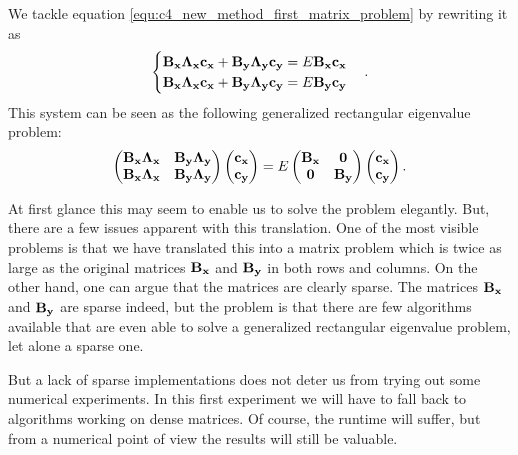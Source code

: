 We tackle equation \eqref{equ:c4_new_method_first_matrix_problem} by rewriting it as
$$
    \begin{cases}
        \vb{B_x} \vb{\Lambda_x}\vb{c_x} + \vb{B_y} \vb{\Lambda_y}\vb{c_y} = E \vb{B_x} \vb{c_x} \\
        \vb{B_x} \vb{\Lambda_x}\vb{c_x} + \vb{B_y} \vb{\Lambda_y}\vb{c_y} = E \vb{B_y} \vb{c_y} \\
    \end{cases}\text{.}
$$
This system can be seen as the following generalized rectangular eigenvalue problem:
\begin{equation}\label{equ:c4_new_method_alternative_system}
    \begin{pmatrix}
        \vb{B_x} \vb{\Lambda_x} & \vb{B_y} \vb{\Lambda_y} \\
        \vb{B_x} \vb{\Lambda_x} & \vb{B_y} \vb{\Lambda_y}
    \end{pmatrix} \begin{pmatrix}
        \vb{c_x} \\ \vb{c_y}
    \end{pmatrix} = E \begin{pmatrix}
        \vb{B_x} & \vb{0} \\ \vb{0} & \vb{B_y}
    \end{pmatrix} \begin{pmatrix}
        \vb{c_x} \\ \vb{c_y}
    \end{pmatrix}\text{.}
\end{equation}

At first glance this may seem to enable us to solve the problem elegantly. But, there are a few issues apparent with this translation. One of the most visible problems is that we have translated this into a matrix problem which is twice as large as the original matrices $\vb{B_x}$ and $\vb{B_y}$ in both rows and columns. On the other hand, one can argue that the matrices are clearly sparse. The matrices $\vb{B_x}$ and $\vb{B_y}$ are sparse indeed, but the problem is that there are few algorithms available that are even able to solve a generalized rectangular eigenvalue problem, let alone a sparse one.

But a lack of sparse implementations does not deter us from trying out some numerical experiments. In this first experiment we will have to fall back to algorithms working on dense matrices. Of course, the runtime will suffer, but from a numerical point of view the results will still be valuable.

